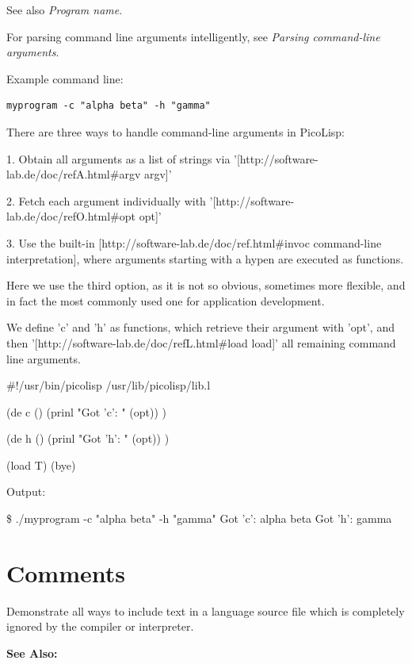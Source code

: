 See also \emph{Program name}.

For parsing command line arguments intelligently, see \emph{Parsing
  command-line arguments}.

Example command line:

\begin{verbatim}
myprogram -c "alpha beta" -h "gamma"
\end{verbatim}



\begin{wideverbatim}

There are three ways to handle command-line arguments in PicoLisp:

1. Obtain all arguments as a list of strings via 
'[http://software-lab.de/doc/refA.html#argv argv]'

2. Fetch each argument individually with 
'[http://software-lab.de/doc/refO.html#opt opt]'

3. Use the built-in 
[http://software-lab.de/doc/ref.html#invoc command-line interpretation], 
where arguments starting with a hypen are executed as functions.

Here we use the third option, as it is not so obvious, sometimes more flexible,
and in fact the most commonly used one for application development.

We define 'c' and 'h' as functions, which retrieve their argument with 'opt',
and then '[http://software-lab.de/doc/refL.html#load load]' all remaining
command line arguments.

#!/usr/bin/picolisp /usr/lib/picolisp/lib.l

(de c ()
   (prinl "Got 'c': " (opt)) )

(de h ()
   (prinl "Got 'h': " (opt)) )

(load T)
(bye)

Output:

\$ ./myprogram -c "alpha beta" -h "gamma"
Got 'c': alpha beta
Got 'h': gamma

\end{wideverbatim}

\pagebreak{}
\section*{Comments}

Demonstrate all ways to include text in a language source file which is
completely ignored by the compiler or interpreter.

\textbf{See Also:}\\

